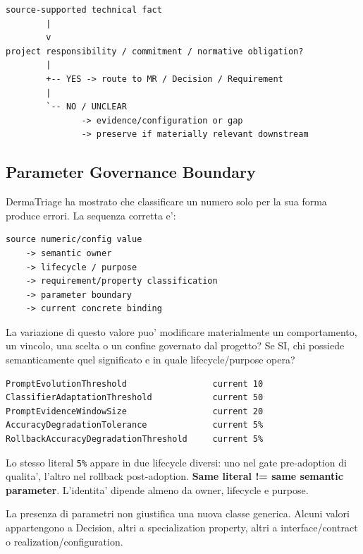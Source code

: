 \documentclass[11pt,a4paper]{article}
\begin{document}
\begin{lstlisting}
source-supported technical fact
        |
        v
project responsibility / commitment / normative obligation?
        |
        +-- YES -> route to MR / Decision / Requirement
        |
        `-- NO / UNCLEAR
               -> evidence/configuration or gap
               -> preserve if materially relevant downstream
\end{lstlisting}

\subsection{Parameter Governance Boundary}
\holdouttag

DermaTriage ha mostrato che classificare un numero solo per la sua forma produce errori. La sequenza corretta e':

\begin{lstlisting}
source numeric/config value
    -> semantic owner
    -> lifecycle / purpose
    -> requirement/property classification
    -> parameter boundary
    -> current concrete binding
\end{lstlisting}

\begin{ddtacheck}[title={Domanda fondamentale per un parametro}]
La variazione di questo valore puo' modificare materialmente un comportamento, un vincolo, una scelta o un confine governato dal progetto? Se SI, chi possiede semanticamente quel significato e in quale lifecycle/purpose opera?
\end{ddtacheck}

\begin{ddtaexample}[title={DermaTriage - cinque ruoli diversi}]
\begin{lstlisting}
PromptEvolutionThreshold                 current 10
ClassifierAdaptationThreshold            current 50
PromptEvidenceWindowSize                 current 20
AccuracyDegradationTolerance             current 5%
RollbackAccuracyDegradationThreshold     current 5%
\end{lstlisting}
Lo stesso literal \texttt{5\%} appare in due lifecycle diversi: uno nel gate pre-adoption di qualita', l'altro nel rollback post-adoption. \textbf{Same literal != same semantic parameter}. L'identita' dipende almeno da owner, lifecycle e purpose.
\end{ddtaexample}

\begin{ddtaanti}[title={Non inventare una ConfigurationRequirement}]
La presenza di parametri non giustifica una nuova classe generica. Alcuni valori appartengono a Decision, altri a specialization property, altri a interface/contract o realization/configuration.
\end{ddtaanti}
\end{document}

